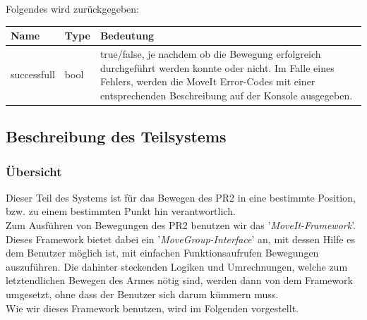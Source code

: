 \documentclass{suturo}
\begin{document}
Folgendes wird zurückgegeben:


\begin{center}
	\begin{tabular}{ l | l | p{10cm}}
		Name & Type & Bedeutung \\ \hline
		successfull & bool & true/false, je nachdem ob die Bewegung erfolgreich durchgeführt werden konnte oder nicht. Im Falle eines Fehlers, werden die MoveIt Error-Codes mit einer entsprechenden Beschreibung auf der Konsole ausgegeben. \\
	\end{tabular}
\end{center}


\subsection{Beschreibung des Teilsystems}
\subsubsection{Übersicht}
Dieser Teil des Systems ist für das Bewegen des PR2 in eine bestimmte Position, bzw. zu einem bestimmten Punkt hin verantwortlich.\\
Zum Ausführen von Bewegungen des PR2 benutzen wir das '\textit{MoveIt-Framework}'. Dieses Framework bietet dabei ein '\textit{MoveGroup-Interface}' an, mit dessen Hilfe es dem Benutzer möglich ist, mit einfachen Funktionsaufrufen Bewegungen auszuführen. Die dahinter steckenden Logiken und Umrechnungen, welche zum letztendlichen Bewegen des Armes nötig sind, werden dann von dem Framework umgesetzt, ohne dass der Benutzer sich darum kümmern muss.\\
Wie wir dieses Framework benutzen, wird im Folgenden vorgestellt.
\end{document}
